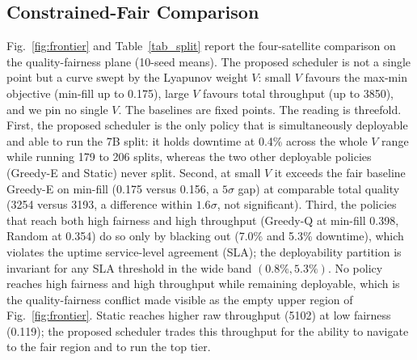 \subsection{Constrained-Fair Comparison}\label{EV_MULTI}
Fig.~\ref{fig:frontier} and Table~\ref{tab_split} report the four-satellite
comparison on the quality-fairness plane (10-seed means). The proposed scheduler
is not a single point but a curve swept by the Lyapunov weight $V$: small $V$
favours the max-min objective (min-fill up to 0.175), large $V$ favours total
throughput (up to 3850), and we pin no single $V$. The baselines are fixed points.
The reading is threefold. First, the proposed scheduler is the only policy that is
simultaneously deployable and able to run the 7B split: it holds downtime at 0.4\%
across the whole $V$ range while running 179 to 206 splits, whereas the two other
deployable policies (Greedy-E and Static) never split. Second, at small $V$ it
exceeds the fair baseline Greedy-E on min-fill (0.175 versus 0.156, a $5\sigma$
gap) at comparable total quality (3254 versus 3193, a difference within
$1.6\sigma$, not significant). Third, the policies that reach both high fairness and high throughput
(Greedy-Q at min-fill 0.398, Random at 0.354) do so only by blacking out (7.0\% and
5.3\% downtime), which violates the uptime service-level agreement (SLA); the
deployability partition is invariant for any SLA threshold in the wide band
$(0.8\%, 5.3\%)$. No policy reaches high fairness and high throughput while
remaining deployable, which is the quality-fairness conflict made visible as the
empty upper region of Fig.~\ref{fig:frontier}. Static reaches higher raw
throughput (5102) at low fairness (0.119); the proposed scheduler trades this
throughput for the ability to navigate to the fair region and to run the top tier.

